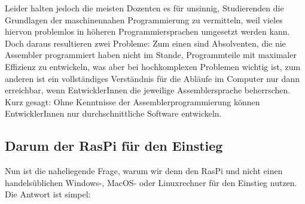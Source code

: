 Leider halten jedoch die meisten Dozenten es für unsinnig, Studierenden die Grundlagen der maschinennahen Programmierung zu vermitteln, weil vieles hiervon problemlos in höheren Programmiersprachen umgesetzt werden kann. Doch daraus resultieren zwei Probleme: Zum einen sind Absolventen, die nie Assembler programmiert haben nicht im Stande, Programmteile mit maximaler Effizienz zu entwickeln, was aber bei hochkomplexen Problemen wichtig ist, zum anderen ist ein vollständiges Verständnis für die Abläufe im Computer nur dann erreichbar, wenn EntwicklerInnen die jeweilige Assemblersprache beherrschen.\\

Kurz gesagt: Ohne Kenntnisse der Assemblerprogrammierung können EntwicklerInnen nur durchschnittliche Software entwickeln.

\subsection{Darum der RasPi für den Einstieg}

Nun ist die naheliegende Frage, warum wir denn den RasPi und nicht einen \glqq{}handelsüblichen\grqq{} Windows-, MacOS- oder Linuxrechner für den Einstieg nutzen. Die Antwort ist simpel:

